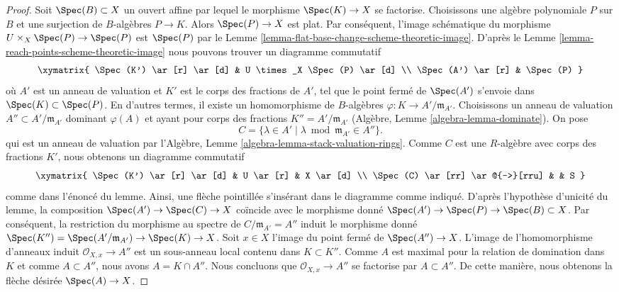 \begin{proof}
\medskip\noindent
Soit $\Spec(B) \subset X$ un ouvert affine par lequel le
morphisme $\Spec(K) \to X$ se factorise. Choisissons une algèbre
polynomiale $P$ sur $B$ et une surjection de
$B$-algèbres $P \to K$. Alors $\Spec(P) \to X$
est plat. Par conséquent, l'image schématique du morphisme
$U \times_X \Spec(P) \to \Spec(P)$ est $\Spec(P)$ par le Lemme \ref{lemma-flat-base-change-scheme-theoretic-image}.
D'après le Lemme \ref{lemma-reach-points-scheme-theoretic-image} nous pouvons trouver
un diagramme commutatif
$$
\xymatrix{
\Spec(K') \ar[r] \ar[d] & U \times_X \Spec(P) \ar[d] \\
\Spec(A') \ar[r] & \Spec(P)
}
$$
où $A'$ est un anneau de valuation et $K'$ est le corps des fractions de $A'$,
tel que le point fermé de $\Spec(A')$ s'envoie
dans $\Spec(K) \subset \Spec(P)$. En d'autres termes,
il existe un homomorphisme de $B$-algèbres $\varphi : K \to A'/\mathfrak m_{A'}$.
Choisissons un anneau de valuation $A'' \subset A'/\mathfrak m_{A'}$ dominant
$\varphi(A)$ et ayant pour corps des fractions
$K'' = A'/\mathfrak m_{A'}$ (Algèbre, Lemme \ref{algebra-lemma-dominate}). On pose
$$
C = \{\lambda \in A' \mid \lambda \bmod \mathfrak m_{A'} \in A''\}.
$$
qui est un anneau de valuation
par l'Algèbre, Lemme \ref{algebra-lemma-stack-valuation-rings}. Comme $C$ est une $R$-algèbre
avec corps des fractions $K'$, nous obtenons un diagramme
commutatif
$$
\xymatrix{
\Spec(K') \ar[r] \ar[d] & U \ar[r] & X \ar[d] \\
\Spec(C) \ar[rr] \ar@{-->}[rru] & & S
}
$$
comme dans l'énoncé du lemme. Ainsi, une flèche pointillée
s'insérant dans le diagramme comme indiqué. D'après
l'hypothèse d'unicité du lemme, la composition $\Spec(A') \to \Spec(C) \to X$
coïncide avec le morphisme donné $\Spec(A') \to \Spec(P) \to \Spec(B) \subset X$. Par
conséquent, la restriction du morphisme au spectre
de $C/\mathfrak m_{A'} = A''$ induit le morphisme donné
$\Spec(K'') = \Spec(A'/\mathfrak m_{A'}) \to \Spec(K) \to X$. Soit $x \in X$ l'image du point fermé
de $\Spec(A'') \to X$. L'image de l'homomorphisme d'anneaux induit
$\mathcal{O}_{X, x} \to A''$ est un sous-anneau local contenu dans
$K \subset K''$. Comme $A$ est maximal pour
la relation de domination dans $K$ et comme
$A \subset A''$, nous avons $A = K \cap A''$. Nous concluons
que $\mathcal{O}_{X, x} \to A''$ se factorise par $A \subset A''$. De cette manière,
nous obtenons la flèche désirée $\Spec(A) \to X$.


\end{proof}
